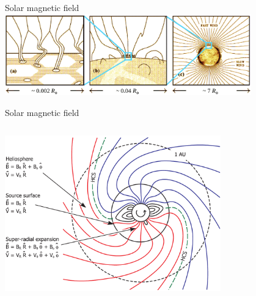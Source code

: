 \begin{frame}[plain,c]{Solar magnetic field}{}
	\centering
	\includegraphics[width=0.8\textwidth]{../figures_of_others/images/Cranmer2005_fig1_color.png}
\end{frame}
\begin{frame}[plain,c]{Solar magnetic field}{}
	\begin{columns}[c]
	\column{\textwidth}

	\centering
	\includegraphics[width=0.7\textwidth]{../figures_of_others/images/Owens2013_PFSS_Sectors_screenshot.png}
	
	\end{columns}
\end{frame}

